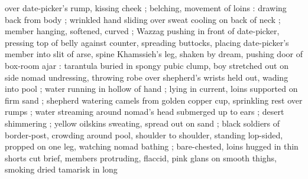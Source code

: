 over date-picker's rump, kissing cheek ; belching, movement of loins : drawing back from body ;
wrinkled hand sliding over sweat cooling on back of neck ; member hanging, softened, curved ; Wazzag
pushing in front of date-picker, pressing top of belly against counter, spreading buttocks, placing
date-picker's member into slit of arse, spine {\semisplosion} Khamssieh's leg, shaken by dream,
pushing door of box-room ajar : tarantula buried in spongy pubic clump, boy stretched out on
side{\td} {\semislash} nomad undressing, throwing robe over shepherd's wrists held out, wading into
pool ; water running in hollow of hand ; lying in current, loins supported on firm sand ; shepherd
watering camels from golden copper cup, sprinkling rest over rumps ; water streaming around nomad's
head submerged up to ears ; desert shimmering ; yellow oilskins sweating, spread out on sand ; black
soldiers of border-post, crowding around pool, shoulder to shoulder, standing lop-sided, propped on
one leg, watching nomad bathing ; bare-chested, loins hugged in thin shorts cut brief, members
protruding, flaccid, pink glans on smooth thighs, smoking dried tamarisk in long %
